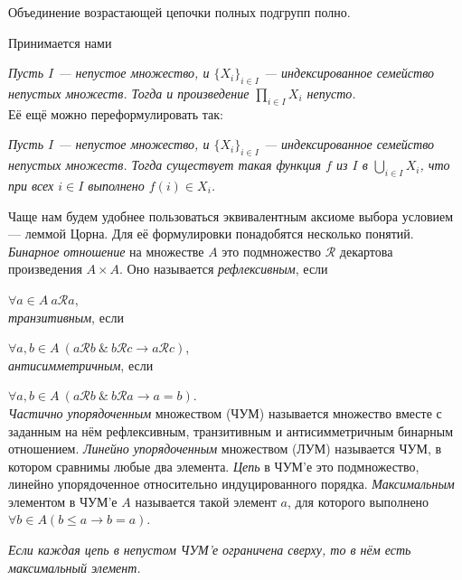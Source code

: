 \documentclass[10pt,a4paper,draft]{article}
\begin{document}
\begin{stm}
Объединение возрастающей цепочки полных подгрупп полно.
\end{stm}

Принимается нами

\vskip 2pt
{\sl Пусть $I$
--- непустое множество, и $\{X_i\}_{i\in I}$ --- индексированное
семейство непустых множеств. Тогда и произведение
$\prod\limits_{i\in I}X_i$ непусто.}
\\ Её ещё можно переформулировать так:
\par {\sl Пусть $I$ --- непустое множество, и $\{X_i\}_{i\in I}$ ---
индексированное семейство непустых множеств. Тогда существует
такая функция $f$ из $I$ в $\bigcup\limits_{i\in I}X_i$, что при
всех $i\in I$ выполнено $f(i)\in X_i$.}

Чаще нам будем удобнее пользоваться эквивалентным аксиоме выбора
условием --- леммой Цорна. Для её формулировки понадобятся
несколько понятий. \emph{Бинарное
отношение} на множестве $A$ это
подмножество $\mathcal{R}$ декартова произведения $A\times A$. Оно
называется {\em рефлексивным}, если

\hfil$\forall a\in A~a\mathcal{R}a$,\hfil\\ {\em
транзитивным}, если

\hfil$\forall a,b\in A~
(a\mathcal{R}b~\&~b\mathcal{R}c\rightarrow a\mathcal{R}c)$,\hfil\\
{\em антисимметричным}, если

\hfil$\forall a,b\in A~ (a\mathcal{R}b~\&~
b\mathcal{R}a\rightarrow a=b)$.\hfil\\ {\em Частично
упорядоченным}
множеством (ЧУМ) называется множество вместе с заданным на нём
рефлексивным, транзитивным и антисимметричным бинарным отношением.
{\em Линейно упорядоченным} множеством (ЛУМ) называется ЧУМ, в котором сравнимы любые
два элемента. {\em Цепь} в ЧУМ'е это подмножество,
линейно упорядоченное относительно индуцированного порядка. {\em
Максимальным} элементом в ЧУМ'е $A$
называется такой элемент $a$, для которого выполнено $\forall b\in
A (b\leqslant a \rightarrow b=a)$.

\vskip 2pt {\sl Если
каждая цепь в непустом ЧУМ'е ограничена сверху, то в нём есть
максимальный элемент.}
\end{document}
